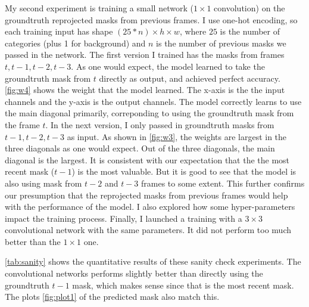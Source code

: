 My second experiment is training a small network ($1 \times 1$ convolution) on the groundtruth reprojected masks from previous frames. I use one-hot encoding, so each training input has shape $(25*n) \times h \times w$, where $25$ is the number of categories (plus 1 for background) and $n$ is the number of previous masks we passed in the network. The first version I trained has the masks from frames $t,t-1,t-2,t-3$. As one would expect, the model learned to take the groundtruth mask from $t$ directly as output, and achieved perfect accuracy. \ref{fig:w4} shows the weight that the model learned. The x-axis is the the input channels and the y-axis is the output channels. The model correctly learns to use the main diagonal primarily, correponding to using the groundtruth mask from the frame $t$. In the next version, I only passed in groundtruth masks from $t-1,t-2,t-3$ as input. As shown in \ref{fig:w3}, the weights are largest in the three diagonals as one would expect. Out of the three diagonals, the main diagonal is the largest. It is consistent with our expectation that the the most recent mask ($t-1$) is the most valuable. But it is good to see that the model is also using mask from $t-2$ and $t-3$ frames to some extent. This further confirms our presumption that the reprojected masks from previous frames would help with the performance of the model. I also explored how some hyper-parameters impact the training process. Finally, I launched a training with a $3\times 3$ convolutional network with the same parameters. It did not perform too much better than the $1\times 1$ one. 

\ref{tab:sanity} shows the quantitative results of these sanity check experiments. The convolutional networks performs slightly better than directly using the groundtruth $t-1$ mask, which makes sense since that is the most recent mask. The plots \ref{fig:plot1} of the predicted mask also match this.

